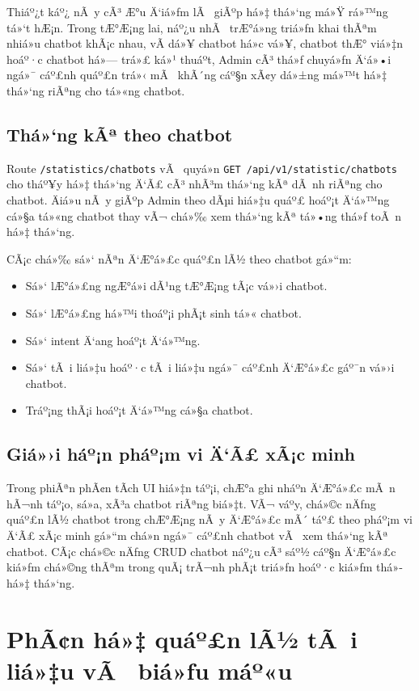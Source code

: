 ﻿\documentclass[12pt,a4paper]{report}
\begin{document}
Thiáº¿t káº¿ nÃ y cÃ³ Æ°u Ä‘iá»ƒm lÃ  giÃºp há»‡ thá»‘ng má»Ÿ rá»™ng tá»‘t hÆ¡n. Trong tÆ°Æ¡ng lai, náº¿u nhÃ  trÆ°á»ng triá»ƒn khai thÃªm nhiá»u chatbot khÃ¡c nhau, vÃ­ dá»¥ chatbot há»c vá»¥, chatbot thÆ° viá»‡n hoáº·c chatbot há»— trá»£ ká»¹ thuáº­t, Admin cÃ³ thá»ƒ chuyá»ƒn Ä‘á»•i ngá»¯ cáº£nh quáº£n trá»‹ mÃ  khÃ´ng cáº§n xÃ¢y dá»±ng má»™t há»‡ thá»‘ng riÃªng cho tá»«ng chatbot.

\subsection{Thá»‘ng kÃª theo chatbot}

Route \texttt{/statistics/chatbots} vÃ  quyá»n \texttt{GET /api/v1/statistic/chatbots} cho tháº¥y há»‡ thá»‘ng Ä‘Ã£ cÃ³ nhÃ³m thá»‘ng kÃª dÃ nh riÃªng cho chatbot. Äiá»u nÃ y giÃºp Admin theo dÃµi hiá»‡u quáº£ hoáº¡t Ä‘á»™ng cá»§a tá»«ng chatbot thay vÃ¬ chá»‰ xem thá»‘ng kÃª tá»•ng thá»ƒ toÃ n há»‡ thá»‘ng.

CÃ¡c chá»‰ sá»‘ nÃªn Ä‘Æ°á»£c quáº£n lÃ½ theo chatbot gá»“m:

\begin{itemize}
    \item Sá»‘ lÆ°á»£ng ngÆ°á»i dÃ¹ng tÆ°Æ¡ng tÃ¡c vá»›i chatbot.
    \item Sá»‘ lÆ°á»£ng há»™i thoáº¡i phÃ¡t sinh tá»« chatbot.
    \item Sá»‘ intent Ä‘ang hoáº¡t Ä‘á»™ng.
    \item Sá»‘ tÃ i liá»‡u hoáº·c tÃ i liá»‡u ngá»¯ cáº£nh Ä‘Æ°á»£c gáº¯n vá»›i chatbot.
    \item Tráº¡ng thÃ¡i hoáº¡t Ä‘á»™ng cá»§a chatbot.
\end{itemize}

\subsection{Giá»›i háº¡n pháº¡m vi Ä‘Ã£ xÃ¡c minh}

Trong phiÃªn phÃ¢n tÃ­ch UI hiá»‡n táº¡i, chÆ°a ghi nháº­n Ä‘Æ°á»£c mÃ n hÃ¬nh táº¡o, sá»­a, xÃ³a chatbot riÃªng biá»‡t. VÃ¬ váº­y, chá»©c nÄƒng quáº£n lÃ½ chatbot trong chÆ°Æ¡ng nÃ y Ä‘Æ°á»£c mÃ´ táº£ theo pháº¡m vi Ä‘Ã£ xÃ¡c minh gá»“m chá»n ngá»¯ cáº£nh chatbot vÃ  xem thá»‘ng kÃª chatbot. CÃ¡c chá»©c nÄƒng CRUD chatbot náº¿u cÃ³ sáº½ cáº§n Ä‘Æ°á»£c kiá»ƒm chá»©ng thÃªm trong quÃ¡ trÃ¬nh phÃ¡t triá»ƒn hoáº·c kiá»ƒm thá»­ há»‡ thá»‘ng.

\section{PhÃ¢n há»‡ quáº£n lÃ½ tÃ i liá»‡u vÃ  biá»ƒu máº«u}
\end{document}
